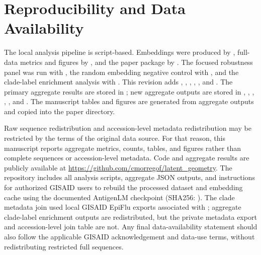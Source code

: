\documentclass[11pt]{article}
\begin{document}
\section{Reproducibility and Data Availability}

The local analysis pipeline is script-based. Embeddings were produced by , full-data metrics and figures by , and the paper package by . The focused robustness panel was run with , the random embedding negative control with , and the clade-label enrichment analysis with . This revision adds , , , , , and . The primary aggregate results are stored in ; new aggregate outputs are stored in , , , , , and . The manuscript tables and figures are generated from aggregate outputs and copied into the paper directory.

Raw sequence redistribution and accession-level metadata redistribution may be restricted by the terms of the original data source. For that reason, this manuscript reports aggregate metrics, counts, tables, and figures rather than complete sequences or accession-level metadata. Code and aggregate results are publicly available at \url{https://github.com/cmorregof/latent_geometry}. The repository includes all analysis scripts, aggregate JSON outputs, and instructions for authorized GISAID users to rebuild the processed dataset and embedding cache using the documented AntigenLM checkpoint (SHA256: ). The clade metadata join used local GISAID EpiFlu exports associated with ; aggregate clade-label enrichment outputs are redistributed, but the private metadata export and accession-level join table are not. Any final data-availability statement should also follow the applicable GISAID acknowledgement and data-use terms, without redistributing restricted full sequences.
\end{document}
